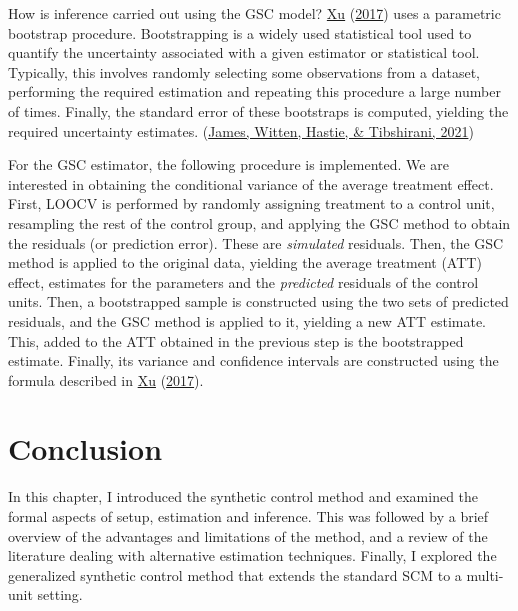 \documentclass[12pt,nobind, a4paper]{reedthesis}
\begin{document}
 How is inference carried out using the GSC model? \protect\hyperlink{ref-xu_generalized_2017}{Xu} (\protect\hyperlink{ref-xu_generalized_2017}{2017}) uses a parametric bootstrap procedure. Bootstrapping is a widely used statistical tool used to quantify the uncertainty associated with a given estimator or statistical tool. Typically, this involves randomly selecting some observations from a dataset, performing the required estimation and repeating this procedure a large number of times. Finally, the standard error of these bootstraps is computed, yielding the required uncertainty estimates. (\protect\hyperlink{ref-james_introduction_2021}{James, Witten, Hastie, \& Tibshirani, 2021})
 \linebreak

 For the GSC estimator, the following procedure is implemented. We are interested in obtaining the conditional variance of the average treatment effect. First, LOOCV is performed by randomly assigning treatment to a control unit, resampling the rest of the control group, and applying the GSC method to obtain the residuals (or prediction error). These are \textit{simulated} residuals. Then, the GSC method is applied to the original data, yielding the average treatment (ATT) effect, estimates for the parameters and the \textit{predicted} residuals of the control units. Then, a bootstrapped sample is constructed using the two sets of predicted residuals, and the GSC method is applied to it, yielding a new ATT estimate. This, added to the ATT obtained in the previous step is the bootstrapped estimate. Finally, its variance and confidence intervals are constructed using the formula described in \protect\hyperlink{ref-xu_generalized_2017}{Xu} (\protect\hyperlink{ref-xu_generalized_2017}{2017}).

 \hypertarget{conclusion-1}{%
 \section{Conclusion}\label{conclusion-1}}

 In this chapter, I introduced the synthetic control method and examined the formal aspects of setup, estimation and inference. This was followed by a brief overview of the advantages and limitations of the method, and a review of the literature dealing with alternative estimation techniques. Finally, I explored the generalized synthetic control method that extends the standard SCM to a multi-unit setting.
 \linebreak
\end{document}
